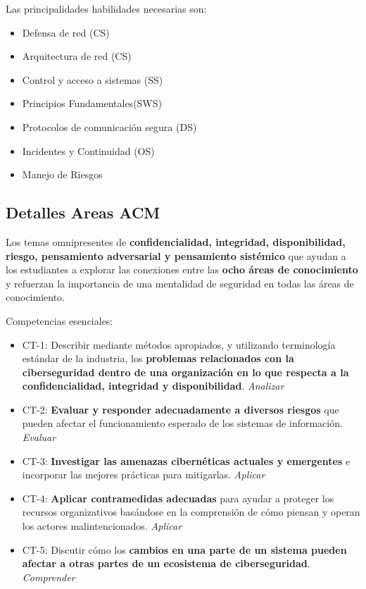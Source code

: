 Las principalidades habilidades necesarias son:	\begin{itemize}
    \item Defensa de red (CS)
    \item Arquitectura de red (CS)
    \item Control y acceso a sistemas (SS)
    \item Principios Fundamentales(SWS)
    \item Protocolos de comunicación segura (DS) \item  Incidentes y Continuidad (OS)
    \item Manejo de Riesgos 
\end{itemize}					


\subsection{Detalles Areas ACM}
\begin{tcolorbox}
[colback=gray!5!white,colframe=blue!10!gray,title= Conceptos transversales] Los temas omnipresentes de \textbf{confidencialidad, integridad, disponibilidad, riesgo, pensamiento adversarial y pensamiento sistémico} que ayudan a los estudiantes a explorar las conexiones entre las \textbf{ocho áreas de conocimiento} y refuerzan la importancia de una mentalidad de seguridad en todas las áreas de conocimiento.

\end{tcolorbox}
Competencias esenciales:
\begin{itemize}
    \item CT-1: Describir mediante métodos apropiados, y utilizando terminología estándar de la industria, los \textbf{problemas relacionados con la ciberseguridad dentro de una organización en lo que respecta a la confidencialidad, integridad y disponibilidad}. \textit{Analizar}
\item CT-2: \textbf{Evaluar y responder adecuadamente a diversos riesgos} que pueden afectar el funcionamiento esperado de los sistemas de información. \textit{Evaluar}
\item CT-3: \textbf{Investigar las amenazas cibernéticas actuales y emergentes} e incorporar las mejores prácticas para mitigarlas. \textit{Aplicar}
\item CT-4: \textbf{Aplicar contramedidas adecuadas} para ayudar a proteger los recursos organizativos basándose en la comprensión de cómo piensan y operan los actores malintencionados. \textit{Aplicar}
\item CT-5: Discutir cómo los \textbf{cambios en una parte de un sistema pueden afectar a otras partes de un ecosistema de ciberseguridad}. \textit{Comprender}
\end{itemize}





